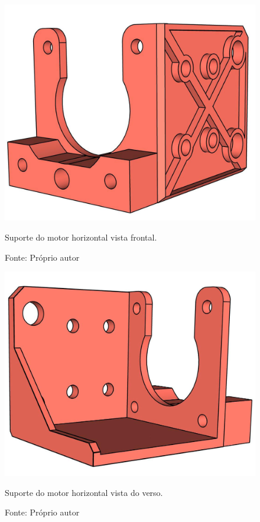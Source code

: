 \begin{figure}[H]
\centering
\includegraphics[scale = 0.4]{figuras/ressuportemotorhorizontalf}
\caption{Suporte do motor horizontal vista frontal.}
\caption*{Fonte: Próprio autor}
\label{fig:ressuportemotorhorizontalf}
\end{figure}
        
\begin{figure}[H]
\centering
\includegraphics[scale = 0.4]{figuras/ressuportemotorhorizontalfv}
\caption{Suporte do motor horizontal vista do verso.}
\caption*{Fonte: Próprio autor}
\label{fig:ressuportemotorhorizontalfv}
\end{figure}
        
